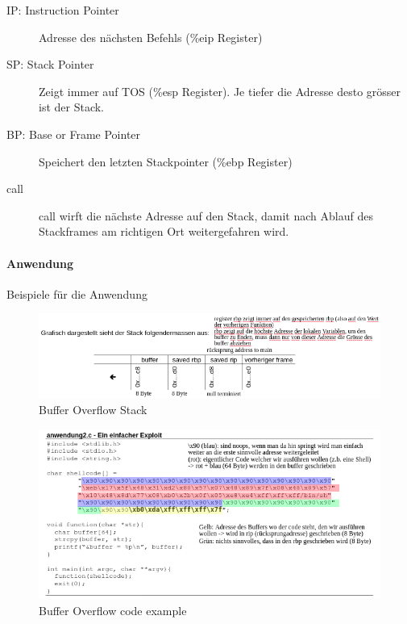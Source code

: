 \begin{description}
	\item[IP: Instruction Pointer] Adresse des nächsten Befehls (\%eip Register)
	\item[SP: Stack Pointer] Zeigt immer auf TOS (\%esp Register). Je tiefer die Adresse desto grösser ist der Stack.
	\item[BP: Base or Frame Pointer] Speichert den letzten Stackpointer (\%ebp Register)
	\item[call] call wirft die nächste Adresse auf den Stack,  damit nach Ablauf des Stackframes am richtigen Ort weitergefahren wird.
\end{description}

\newpage

\paragraph{Anwendung} Beispiele für die Anwendung
\begin{figure}[h]
\centering
\includegraphics[width=1\linewidth]{images/buffer_overflow_stack.png}
\caption{Buffer Overflow Stack}
\label{fig:bufferoverflowstack}
\end{figure}

\begin{figure}[h]
\centering
\includegraphics[width=1\linewidth]{images/buffer_overflow.png}
\caption{Buffer Overflow code example}
\label{fig:bufferoverflowcode}
\end{figure}

